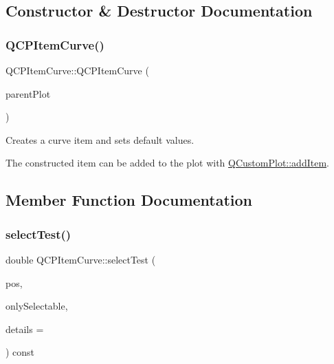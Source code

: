 \subsection{Constructor \& Destructor Documentation}
\hypertarget{class_q_c_p_item_curve_ac9b7508bb5c8827e1a7a6199f8c82bec}{}\label{class_q_c_p_item_curve_ac9b7508bb5c8827e1a7a6199f8c82bec} 
\subsubsection{\texorpdfstring{Q\+C\+P\+Item\+Curve()}{QCPItemCurve()}}
{\footnotesize\ttfamily Q\+C\+P\+Item\+Curve\+::\+Q\+C\+P\+Item\+Curve (\begin{DoxyParamCaption}\item[{\hyperlink{class_q_custom_plot}{Q\+Custom\+Plot} $\ast$}]{parent\+Plot }\end{DoxyParamCaption})}

Creates a curve item and sets default values.

The constructed item can be added to the plot with \hyperlink{class_q_custom_plot_aa500620379262321685cb7a7674cbd2a}{Q\+Custom\+Plot\+::add\+Item}. 

\subsection{Member Function Documentation}
\hypertarget{class_q_c_p_item_curve_a8018b8b3fc552a44ba87ca4b64c1523f}{}\label{class_q_c_p_item_curve_a8018b8b3fc552a44ba87ca4b64c1523f} 
\subsubsection{\texorpdfstring{select\+Test()}{selectTest()}}
{\footnotesize\ttfamily double Q\+C\+P\+Item\+Curve\+::select\+Test (\begin{DoxyParamCaption}\item[{const Q\+PointF \&}]{pos,  }\item[{bool}]{only\+Selectable,  }\item[{Q\+Variant $\ast$}]{details = {} }\end{DoxyParamCaption}) const\hspace{0.3cm}{\ttfamily [virtual]}}

